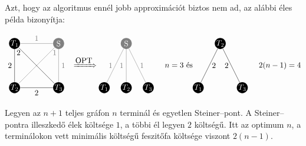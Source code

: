 Azt, hogy az algoritmus ennél jobb approximációt biztos nem ad, az alábbi éles
példa bizonyítja:

\[
	\parbox[l]{3cm}{
		\begin{tikzpicture}[scale=1]
			\tikzset{ p/.style={circle,white,fill=gray,inner sep=0pt,minimum size=0.5cm},
			}
			\node[p,fill=black] (T1) at (-1,  1) {$T_1$};
			\node[p,fill=black] (T2) at (-1, -1) {$T_2$};
			\node[p,fill=black] (T3) at (+1 , -1) {$T_3$};
			\node[p] (S) at (+1 , 1) {S};

			\draw[-] (T1) -- (T3) node [at start, below] {$2$};
			\draw[-] (T1) -- (T2) node [midway, left] {$2$};
			\draw[-] (T2) -- (T3) node [midway, below] {$2$};

			\draw[-,gray] (T1) -- (S) node [midway, above] {$1$};
			\draw[-,gray] (T2) -- (S) node [at end, below] {$1$};
			\draw[-,gray] (T3) -- (S) node [midway, right] {$1$};
		\end{tikzpicture}
	}
	\xRightarrow{\mbox{OPT}}
	\parbox[l]{3cm}{
		\begin{tikzpicture}[scale=1]
			\tikzset{ p/.style={circle,white,fill=gray,inner sep=0pt,minimum size=0.5cm},
			}
			\node[p,fill=black] (T1) at (-1,  0) {$T_1$};
			\node[p,fill=black] (T2) at (0, 0) {$T_2$};
			\node[p,fill=black] (T3) at (+1 , 0) {$T_3$};
			\node[p] (S) at (0 , 2) {S};

			\draw[-,gray] (T1) -- (S) node [midway, left] {$1$};
			\draw[-,gray] (T2) -- (S) node [midway, left] {$1$};
			\draw[-,gray] (T3) -- (S) node [midway, right] {$1$};
		\end{tikzpicture}
	}
	n=3 \mbox{ és}
	\parbox[l]{3cm}{
		\begin{tikzpicture}[scale=1]
			\tikzset{ p/.style={circle,white,fill=gray,inner sep=0pt,minimum size=0.5cm},
			}
			\node[p,fill=black] (T1) at (-1,  0) {$T_1$};
			\node[p,fill=black] (T2) at (0, 2) {$T_2$};
			\node[p,fill=black] (T3) at (+1 , 0) {$T_3$};

			\draw[-] (T1) -- (T2) node [midway, right] {$2$};
			\draw[-] (T2) -- (T3) node [midway, left] {$2$};
		\end{tikzpicture}
	}2(n-1)=4
\]

Legyen az $n+1$ teljes gráfon $n$ terminál és egyetlen Steiner--pont. A
Steiner--pontra illeszkedő élek költsége $1$, a többi él legyen $2$ költségű.
Itt az optimum $n$, a terminálokon vett minimális költségű feszitőfa költsége
viszont $2(n-1)$.
